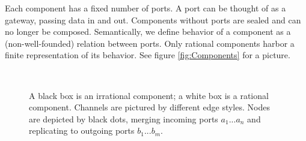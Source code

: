 Each component has a fixed number of ports.
A port can be thought of as a gateway, passing data in and out.
Components without ports are sealed and can no longer be composed.
Semantically, we define behavior of a component as a (non-well-founded) relation between ports.
Only rational components harbor a finite representation of its behavior.
See figure \ref{fig:Components} for a picture.
\begin{figure}[t]
\begin{centering}
$\qquad$$\qquad$
\par\end{centering}
\caption{A black box is an irrational component; a white box is a rational
component. Channels are pictured by different edge styles. Nodes are
depicted by black dots, merging
incoming ports $a_1...a_n$ and replicating to outgoing ports $b_1...b_m$.}
\end{figure}

